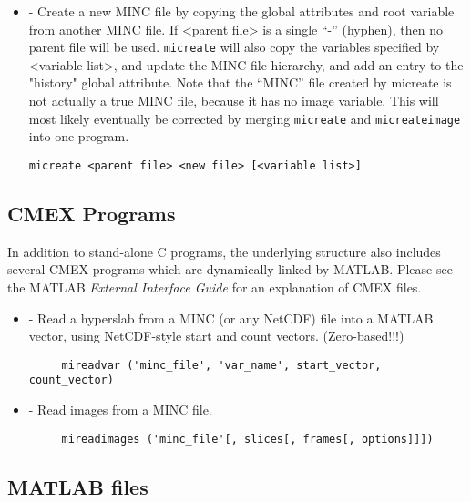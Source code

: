 \begin {itemize}
\item {} - Create a new MINC file by copying the global 
attributes and root variable from another MINC file.  If <parent file>
is a single ``-'' (hyphen), then no parent file will be used.
\verb|micreate| will also copy the variables specified by <variable
list>, and update the MINC file hierarchy, and add an entry to the
"history" global attribute.  Note that the ``MINC'' file created by
micreate is not actually a true MINC file, because it has no image
variable.  This will most likely eventually be corrected by merging
\verb|micreate| and \verb|micreateimage| into one program.
\begin{verbatim}
micreate <parent file> <new file> [<variable list>]
\end{verbatim}

\end{itemize}


\subsection{CMEX Programs}

In addition to stand-alone C programs, the underlying structure also includes
several CMEX programs which are dynamically linked by MATLAB.  Please see the
MATLAB {\em External Interface Guide} for an explanation of CMEX files.

\begin{itemize}

\item {} - Read a hyperslab from a MINC (or any NetCDF) file into a MATLAB
    vector, using NetCDF-style start and count vectors.  (Zero-based!!!)  
\begin{verbatim}
     mireadvar ('minc_file', 'var_name', start_vector, count_vector)
\end{verbatim}

\item {} - Read images from a MINC file.
\begin{verbatim}
     mireadimages ('minc_file'[, slices[, frames[, options]]]) 
\end{verbatim}

\end{itemize}


\subsection{MATLAB files}
\label{emma_reference}







